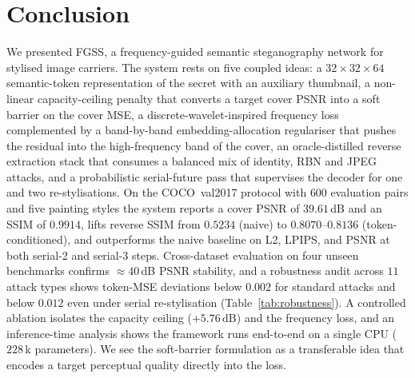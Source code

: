 \documentclass[conference]{IEEEtran}
\begin{document}
\section{Conclusion}
We presented FGSS, a frequency-guided semantic steganography network for stylised image carriers. The system rests on five coupled ideas: a $32\!\times\!32\!\times\!64$ semantic-token representation of the secret with an auxiliary thumbnail, a non-linear capacity-ceiling penalty that converts a target cover PSNR into a soft barrier on the cover MSE, a discrete-wavelet-inspired frequency loss complemented by a band-by-band embedding-allocation regulariser that pushes the residual into the high-frequency band of the cover, an oracle-distilled reverse extraction stack that consumes a balanced mix of identity, RBN and JPEG attacks, and a probabilistic serial-future pass that supervises the decoder for one and two re-stylisations. On the COCO~val2017 protocol with $600$ evaluation pairs and five painting styles the system reports a cover PSNR of $39.61$\,dB and an SSIM of $0.9914$, lifts reverse SSIM from $0.5234$ (naive) to $0.8070$--$0.8136$ (token-conditioned), and outperforms the naive baseline on L2, LPIPS, and PSNR at both serial-2 and serial-3 steps. Cross-dataset evaluation on four unseen benchmarks confirms $\approx\!40$\,dB PSNR stability, and a robustness audit across $11$ attack types shows token-MSE deviations below $0.002$ for standard attacks and below $0.012$ even under serial re-stylisation (Table~\ref{tab:robustness}). A controlled ablation isolates the capacity ceiling ($+5.76$\,dB) and the frequency loss, and an inference-time analysis shows the framework runs end-to-end on a single CPU ($228$\,k parameters). We see the soft-barrier formulation as a transferable idea that encodes a target perceptual quality directly into the loss.
\end{document}
